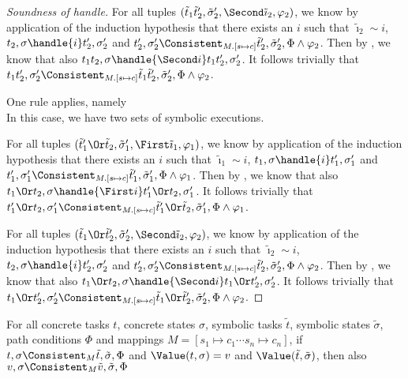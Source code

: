 \begin{proof}[Soundness of handle]
{  For all tuples $(\tilde{t}_1\And\tilde{t}_2',\tilde{\sigma}_2',\Second \tilde{\imath}_2,\phi_2)$,
  we know by application of the induction hypothesis that there exists an $i$ such that
  $\tilde{\imath}_2\sim i$, $t_2,\sigma\handle{i}t_2',\sigma_2'$ and
  $t_2',\sigma_2'\Consistent_{M.[s\mapsto c]}\tilde{t}_2',\tilde{\sigma}_2',\Phi\land\phi_2$.
  Then by , we know that also $t_1\And t_2,\sigma\handle{\Second i}t_1\And t_2',\sigma_2'$.
  It follows trivially that $t_1\And t_2',\sigma_2'\Consistent_{M.[s\mapsto c]}\tilde{t}_1\And \tilde{t}_2',\tilde{\sigma}_2',\Phi\land\phi_2$.
}
%
{One rule applies, namely \\
In this case, we have two sets of symbolic executions.

  For all tuples $(\tilde{t}_1'\Or\tilde{t}_2,\tilde{\sigma}_1',\First \tilde{\imath}_1,\phi_1)$,
  we know by application of the induction hypothesis that there exists an $i$ such that
  $\tilde{\imath}_1\sim i$, $t_1,\sigma\handle{i}t_1',\sigma_1'$ and
  $t_1',\sigma_1'\Consistent_{M.[s\mapsto c]}\tilde{t}_1',\tilde{\sigma}_1',\Phi\land\phi_1$.
  Then by , we know that also $t_1\Or t_2,\sigma\handle{\First i}t_1'\Or t_2,\sigma_1'$.
  It follows trivially that $t_1'\Or t_2,\sigma_1'\Consistent_{M.[s\mapsto c]}\tilde{t}_1'\Or \tilde{t}_2,\tilde{\sigma}_1',\Phi\land\phi_1$.

  For all tuples $(\tilde{t}_1\Or\tilde{t}_2',\tilde{\sigma}_2',\Second \tilde{\imath}_2,\phi_2)$,
  we know by application of the induction hypothesis that there exists an $i$ such that
  $\tilde{\imath}_2\sim i$, $t_2,\sigma\handle{i}t_2',\sigma_2'$ and
  $t_2',\sigma_2'\Consistent_{M.[s\mapsto c]}\tilde{t}_2',\tilde{\sigma}_2',\Phi\land\phi_2$.
  Then by , we know that also $t_1\Or t_2,\sigma\handle{\Second i}t_1\Or t_2',\sigma_2'$.
  It follows trivially that $t_1\Or t_2',\sigma_2'\Consistent_{M.[s\mapsto c]}\tilde{t}_1\Or \tilde{t}_2',\tilde{\sigma}_2',\Phi\land\phi_2$.
}

\end{proof}


\begin{lemma}
  \label{lem:valpres}
  For all concrete tasks $t$, concrete states $\sigma$, symbolic tasks $\tilde{t}$, symbolic states $\tilde{\sigma}$, path conditions $\Phi$ and mappings $M=[s_1\mapsto c_1\cdots s_n\mapsto c_n]$,
  if $t,\sigma\Consistent_M\tilde{t},\tilde{\sigma},\Phi$ and $\Value(t,\sigma)=v$ and $\Value(\tilde{t},\tilde{\sigma})$,
  then also $v,\sigma\Consistent_M\tilde{v},\tilde{\sigma},\Phi$
\end{lemma}


